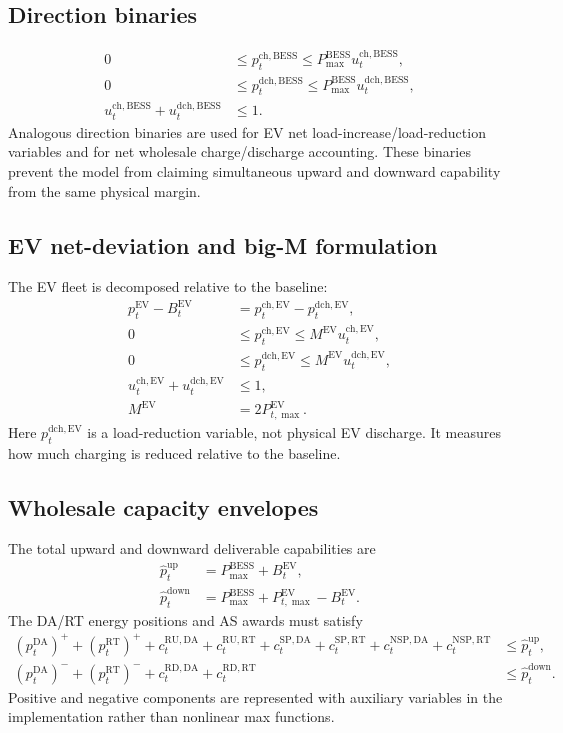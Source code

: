\documentclass[final,5p,times]{elsarticle}
\newcommand{\EV}{\mathrm{EV}}
\newcommand{\BESS}{\mathrm{BESS}}
\newcommand{\DA}{\mathrm{DA}}
\newcommand{\RT}{\mathrm{RT}}
\newcommand{\RU}{\mathrm{RU}}
\newcommand{\RD}{\mathrm{RD}}
\newcommand{\SP}{\mathrm{SP}}
\newcommand{\NSP}{\mathrm{NSP}}
\newcommand{\ch}{\mathrm{ch}}
\newcommand{\dch}{\mathrm{dch}}
\newcommand{\up}{\mathrm{up}}
\newcommand{\down}{\mathrm{down}}
\begin{document}
\subsection{Direction binaries}
\begin{align}
0&\le p_t^{\ch,\BESS}\le P_{\max}^{\BESS}u_t^{\ch,\BESS},\label{eq:app_bess_chbin}\\
0&\le p_t^{\dch,\BESS}\le P_{\max}^{\BESS}u_t^{\dch,\BESS},\label{eq:app_bess_dchbin}\\
u_t^{\ch,\BESS}+u_t^{\dch,\BESS}&\le 1.\label{eq:app_bess_dirbin}
\end{align}
Analogous direction binaries are used for EV net load-increase/load-reduction variables and for net wholesale charge/discharge accounting. These binaries prevent the model from claiming simultaneous upward and downward capability from the same physical margin.

\subsection{EV net-deviation and big-M formulation}
The EV fleet is decomposed relative to the baseline:
\begin{align}
p_t^{\EV}-B_t^{\EV}&=p_t^{\ch,\EV}-p_t^{\dch,\EV},\label{eq:app_ev_deviation}\\
0&\le p_t^{\ch,\EV}\le M^{\EV}u_t^{\ch,\EV},\label{eq:app_ev_ch}\\
0&\le p_t^{\dch,\EV}\le M^{\EV}u_t^{\dch,\EV},\label{eq:app_ev_dch}\\
u_t^{\ch,\EV}+u_t^{\dch,\EV}&\le 1,\label{eq:app_ev_dir}\\
M^{\EV}&=2P_{t,\max}^{\EV}.\label{eq:app_ev_bigM}
\end{align}
Here $p_t^{\dch,\EV}$ is a load-reduction variable, not physical EV discharge. It measures how much charging is reduced relative to the baseline.

\subsection{Wholesale capacity envelopes}
The total upward and downward deliverable capabilities are
\begin{align}
\hat p_t^{\up}&=P_{\max}^{\BESS}+B_t^{\EV},\label{eq:app_upcap}\\
\hat p_t^{\down}&=P_{\max}^{\BESS}+P_{t,\max}^{\EV}-B_t^{\EV}.\label{eq:app_downcap}
\end{align}
The DA/RT energy positions and AS awards must satisfy
\begin{align}
(p_t^{\DA})^+ +(p_t^{\RT})^+ +c_t^{\RU,\DA}+c_t^{\RU,\RT}+c_t^{\SP,\DA}+c_t^{\SP,\RT}+c_t^{\NSP,\DA}+c_t^{\NSP,\RT}&\le \hat p_t^{\up},\label{eq:app_upenv}\\
(p_t^{\DA})^- +(p_t^{\RT})^- +c_t^{\RD,\DA}+c_t^{\RD,\RT}&\le \hat p_t^{\down}.\label{eq:app_downenv}
\end{align}
Positive and negative components are represented with auxiliary variables in the implementation rather than nonlinear max functions.
\end{document}
